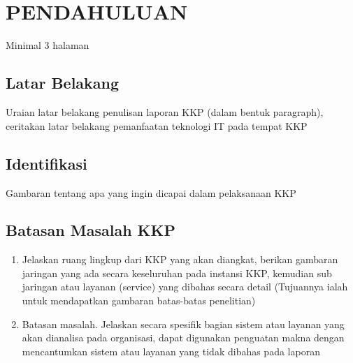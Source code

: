 
\chapter[PENDAHULUAN]{\\ PENDAHULUAN}

Minimal 3 halaman

\section{Latar Belakang}
\begin{sectioncontent}
    \hspace{\parindent}Uraian latar belakang penulisan laporan KKP (dalam bentuk paragraph), ceritakan latar belakang pemanfaatan teknologi IT pada tempat KKP
\end{sectioncontent}

\section{Identifikasi}
\begin{sectioncontent}
    Gambaran tentang apa yang ingin dicapai dalam pelaksanaan KKP
\end{sectioncontent}

\section{Batasan Masalah KKP}
\begin{sectioncontent}
    \begin{enumerate}[leftmargin=0.5cm]
        \item Jelaskan ruang lingkup dari KKP yang akan diangkat, berikan gambaran jaringan yang ada secara keseluruhan pada instansi KKP, kemudian sub jaringan atau layanan (service) yang dibahas secara detail (Tujuannya ialah untuk mendapatkan gambaran batas-batas penelitian)
        \item Batasan masalah. Jelaskan secara spesifik bagian sistem atau layanan yang akan dianalisa pada organisasi, dapat digunakan penguatan makna dengan mencantumkan sistem atau layanan yang tidak dibahas pada laporan
    \end{enumerate}
\end{sectioncontent}

